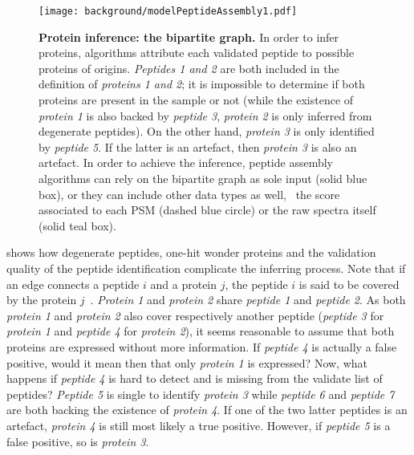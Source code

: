 \begin{figure}[!htb]
    \texttt{[image: background/modelPeptideAssembly1.pdf]}\centering
    \vspace{-0.2mm}
    \caption[Protein inference: the bipartite graph]{\label{fig:bipartite}%
    \textbf{Protein inference: the bipartite graph.} In order to infer proteins,
    algorithms attribute each validated peptide to possible proteins of origins.
    \textit{Peptides 1 and 2} are both included in the definition of
    \textit{proteins 1 and 2};
    it is impossible to determine if both proteins are present in the sample or
    not (while the existence of \textit{protein 1} is also backed by \textit{peptide 3},
    \textit{protein 2} is only inferred from degenerate peptides).
    On the other hand, \textit{protein 3} is only identified by \textit{peptide 5}.
    If the latter is an artefact, then \textit{protein 3} is also an artefact.
    In order to achieve the inference,
    peptide assembly algorithms can rely on
    the bipartite graph as sole input (solid blue box),
    or they can include other data types as well,
    \eg\ the score associated to each \gls{PSM} (dashed blue circle) or
    the raw spectra itself (solid teal box).
    }
\end{figure}

 shows how degenerate peptides, one-hit wonder proteins
and the validation quality of the peptide identification
complicate the inferring process.
Note that if an edge connects a peptide $i$ and a protein $j$,
the peptide $i$ is said to be covered by the protein $j$~.
\textit{Protein 1} and \textit{protein 2} share
\textit{peptide 1} and \textit{peptide 2}.
As both \textit{protein 1} and \textit{protein 2} also cover respectively
another peptide (\textit{peptide 3} for \textit{protein 1}
and \textit{peptide 4} for \textit{protein 2}),
it seems reasonable to assume that both proteins are expressed without more information.
If \textit{peptide 4} is actually a false positive,
would it mean then that only \textit{protein 1} is expressed?
Now, what happens if \textit{peptide 4} is hard to detect and
is missing from the validate list of peptides?
\textit{Peptide 5} is single to identify \textit{protein 3}
while \textit{peptide 6} and \textit{peptide 7} are
both backing the existence of \textit{protein 4}.
If one of the two latter peptides is an artefact,
\textit{protein 4} is still most likely a true positive.
However, if \textit{peptide 5} is a false positive,
so is \textit{protein 3}.

